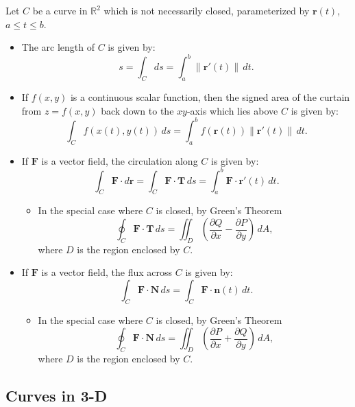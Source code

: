 \documentclass[10pt]{article}
\newcommand{\mb}[1]{\mathbf{#1}}
\newcommand{\vecfuc}[2]{\mb{#1}(#2)}
\newcommand{\dvecfuc}[2]{\mb{#1}'(#2)}
\newcommand{\normdvecfuc}[2]{\| \mb{#1}'(#2) \|}
\newcommand{\R}{\mathbb{R}}
\begin{document}
Let \(C\) be a curve in \(\R^{2}\) which is not necessarily closed, parameterized by \(\vecfuc{r}{t}\), \(a \leq t \leq b\).
\begin{itemize}
    \item The arc length of \(C\) is given by: 
    \[
        s = \displaystyle\int_{C} ds = \int_{a}^{b} \normdvecfuc{r}{t} \, dt.
    \]
    \item If \(f(x,y)\) is a continuous scalar function, then the signed area of the curtain from \(z = f(x,y)\) back down to the \(xy\)-axis which lies above \(C\) is given by:
    \[
        \int_{C} f(x(t), y(t)) \, ds = \int_{a}^{b} f(\vecfuc{r}{t}) \normdvecfuc{r}{t} \, dt.
    \]
    \item If \(\mb{F}\) is a vector field, the circulation along \(C\) is given by:
    \[
        \int_{C} \mb{F} \cdot d\mb{r} = \int_{C} \mb{F} \cdot \mb{T} \, ds = \int_{a}^{b} \mb{F} \cdot \dvecfuc{r}{t} \, dt.
    \]
    \begin{itemize}
        \item In the special case where \(C\) is closed, by Green’s Theorem
        \[
            \oint_{C} \mb{F} \cdot \mb{T} \, ds = \iint_{D} \left( \frac{\partial Q}{\partial x} - \frac{\partial P}{\partial y} \right)  \, dA,
        \]
        where \(D\) is the region enclosed by \(C\).
    \end{itemize}
    \item If \(\mb{F}\) is a vector field, the flux across \(C\) is given by:
    \[
        \int_{C} \mb{F} \cdot \mb{N} \, ds = \int_{C} \mb{F} \cdot \mb{n}(t) \, dt.
    \]
    \begin{itemize}
        \item In the special case where \(C\) is closed, by Green’s Theorem
        \[
            \oint_{C} \mb{F} \cdot \mb{N} \, ds = \iint_{D} \left( \frac{\partial P}{\partial x} + \frac{\partial Q}{\partial y} \right)  \, dA, 
        \]
        where \(D\) is the region enclosed by \(C\).
    \end{itemize}
\end{itemize}

\subsection*{Curves in 3-D}
\end{document}
